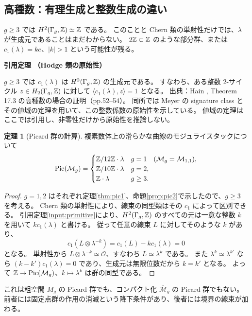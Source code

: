 \documentclass[dvipdfmx,a4paper,11pt]{article}
\theoremstyle{definition}
\newtheorem{thm}{定理}[section]
\newcommand{\OO}{\mathcal O}\newcommand{\MM}{\mathcal M}\newcommand{\TT}{\mathcal T}
\newcommand{\cM}{\overline{\mathcal M}}
\newenvironment{external}[1]{\Needspace{7\baselineskip}\refstepcounter{thm}\begin{tcolorbox}[mybox,colback=blue!2,colframe=blue!40!black]\textbf{引用定理 \thethm（#1）}\par}{\end{tcolorbox}}
\begin{document}
\subsection{高種数：有理生成と整数生成の違い}
$g\ge3$ では $H^2(\Gamma_g,\mathbb Z)\simeq\mathbb Z$ である。
このことと Chern 類の単射性だけでは、$\lambda$ が生成元であることはまだわからない。
$2\mathbb Z\subset\mathbb Z$ のような部分群、または $c_1(\lambda)=ke$、$|k|>1$ という可能性が残る。

\begin{external}{Hodge 類の原始性}\label{input:primitive}
$g\ge3$ では $c_1(\lambda)$ は $H^2(\Gamma_g,\mathbb Z)$ の生成元である。
すなわち、ある整数 $2$-サイクル $z\in H_2(\Gamma_g,\mathbb Z)$ に対して
$\langle c_1(\lambda),z\rangle=1$ となる。
出典：Hain \cite{Hain}, Theorem 17.3 の高種数の場合の証明（pp.52--54）。
同所では Meyer の signature class とその値域の定理を用いて、この整数係数の原始性を示している。
値域の定理はここでは引用し、非零性だけから原始性を推論しない。
\end{external}
\begin{thm}[Picard 群の計算]\label{thm:picall}
複素数体上の滑らかな曲線のモジュライスタックについて
\[
\Pic(\MM_g)=
\begin{cases}
\Z/12\Z\cdot\lambda&g=1\quad(\MM_g=\MM_{1,1}),\\
\Z/10\Z\cdot\lambda&g=2,\\
\Z\cdot\lambda&g\ge3.
\end{cases}
\]
\end{thm}
\begin{proof}
$g=1,2$ はそれぞれ定理\ref{thm:pic1}、命題\ref{prop:pic2}で示したので、$g\ge3$ を考える。
Chern 類の単射性により、線束の同型類はその $c_1$ によって区別できる。
引用定理\ref{input:primitive}により、$H^2(\Gamma_g,\mathbb Z)$ のすべての元は一意な整数 $k$ を用いて $k c_1(\lambda)$ と書ける。
従って任意の線束 $L$ に対してそのような $k$ があり、
\[
c_1(L\otimes\lambda^{-k})=c_1(L)-k c_1(\lambda)=0
\]
となる。
単射性から $L\otimes\lambda^{-k}\simeq\OO$、すなわち $L\simeq\lambda^k$ である。
また $\lambda^k\simeq\lambda^{k'}$ なら $(k-k')c_1(\lambda)=0$ であり、生成元は無限位数だから $k=k'$ となる。
よって $\Z\to\Pic(\MM_g)$、$k\mapsto\lambda^k$ は群の同型である。
\end{proof}
これは粗空間 $M_g$ の Picard 群でも、コンパクト化 $\cM_g$ の Picard 群でもない。
前者には固定点群の作用の消滅という降下条件があり、後者には境界の線束が加わる。
\end{document}
